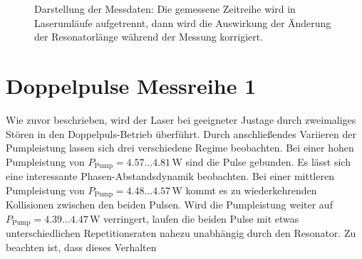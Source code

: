 \documentclass[bachelor,       %
               twoside,        %
               BCOR10mm,       %
               liststotoc,nomtotoc,bibtotoc, %
               english,ngerman, %
               final,          %
               ]{GAUBM}
\begin{document}
\begin{figure}[!htb]
   \hfill
   \caption{Darstellung der Messdaten: Die gemessene Zeitreihe wird in Laserumläufe aufgetrennt, dann wird die Auswirkung der Änderung der Resonatorlänge während der Messung korrigiert.}
   \label{fig:MessdatenDarstellung}
\end{figure}
 


\clearpage
\section{Doppelpulse Messreihe 1}
Wie zuvor beschrieben, wird der Laser bei geeigneter Justage durch zweimaliges Stören in den Doppelpuls-Betrieb überführt.
Durch anschließendes Variieren der Pumpleistung lassen sich drei verschiedene Regime beobachten.
Bei einer hohen Pumpleistung von $P_\text{Pump}=4.57\dots 4.81\,$W sind die Pulse gebunden.
Es lässt sich eine interessante Phasen-Abstandsdynamik beobachten.
Bei einer mittleren Pumpleistung von $P_\text{Pump}=4.48\dots 4.57\,$W kommt es zu wiederkehrenden Kollisionen zwischen den beiden Pulsen.
Wird die Pumpleistung weiter auf $P_\text{Pump}=4.39\dots 4.47\,$W verringert, laufen die beiden Pulse mit etwas unterschiedlichen Repetitionsraten nahezu unabhängig durch den Resonator.
Zu beachten ist, dass dieses Verhalten 
\end{document}

